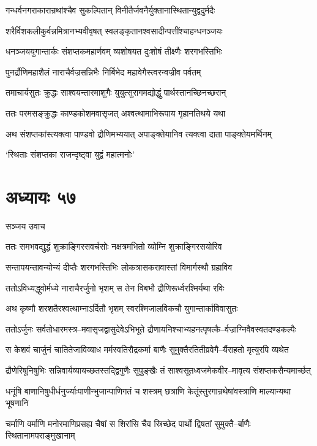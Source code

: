\twolineshloka
{गन्धर्वनगराकारान्रथांश्चैव सुकल्पितान्}
{विनीतैर्जवनैर्युक्तानास्थितान्युद्वदुर्मदैः}


\twolineshloka
{शरैर्विशकलीकुर्वन्नमित्रानभ्यवीवृषत्}
{स्वलङ्कृतानश्वसादीन्पत्तींश्चाहन्धनञ्जयः}


\twolineshloka
{धनञ्जययुगान्तार्कः संशप्तकमहार्णवम्}
{व्यशोषयत दुःशोषं तीक्ष्णैः शरगभस्तिभिः}


\twolineshloka
{पुनर्द्रौणिमहाशैलं नाराचैर्वज्रसन्निभैः}
{निर्बिभेद महावेगैस्त्वरन्वज्रीव पर्वतम्}


\twolineshloka
{तमाचार्यसुतः क्रुद्धः साश्वयन्तारमाशुगैः}
{युयुत्सुरागमद्योद्धुं पार्थस्तानच्छिनच्छरान्}


\twolineshloka
{ततः परमसङ्क्रुद्धः काण्डकोशमवासृजत्}
{अश्वत्थामाभिरूपाय गृहानतिथये यथा}


\twolineshloka
{अथ संशप्तकांस्त्यक्त्वा पाण्डवो द्रौणिमभ्ययात्}
{अपाङ्क्तेयानिव त्यक्त्वा दाता पाङ्क्तेयमर्थिनम्}


`स्थिताः संशप्तका राजन्दृष्ट्वा युद्वं महात्मनोः'
\chapter{अध्यायः ५७}
\twolineshloka
{सञ्जय उवाच}
{}


\twolineshloka
{ततः समभवद्युद्धं शुक्राङ्गिरसवर्चसोः}
{नक्षत्रमभितो व्योम्नि शुक्राङ्गिरसयोरिव}


\twolineshloka
{सन्तापयन्तावन्योन्यं दीप्तैः शरगभस्तिभिः}
{लोकत्रासकरावास्तां विमार्गस्थौ ग्रहाविव}


\twolineshloka
{ततोऽविध्यद्धुवोर्मध्ये नाराचैरर्जुनो भृशम्}
{स तेन विबभौ द्रौणिरूर्ध्वरश्मिर्यथा रविः}


\twolineshloka
{अथ कृष्णौ शरशतैरश्वत्थाम्नाऽर्दितौ भृशम्}
{स्वरश्मिजालविकचौ युगान्तार्काविवासुतः}


\twolineshloka
{ततोऽर्जुनः सर्वतोधारमस्त्र--मवासृजद्वासुदेवेऽभिभूते}
{द्रौणायनिश्चाभ्यहनत्पृषत्कै--र्वज्राग्निवैवस्वतदण्डकल्पैः}


\twolineshloka
{स केशवं चार्जुनं चातितेजाविव्याध मर्मस्वतिरौद्रकर्मा}
{बाणैः सुमुक्तैरतितीव्रवेगै--र्यैराहतो मृत्युरपि व्यथेत}


\twolineshloka
{द्रौणेरिषूनिषुभिः सन्निवार्यव्यायच्छतस्तद्द्विगुणैः सुपुङ्खैः}
{तं साश्वसूतध्वजमेकवीर--मावृत्य संशप्तकसैन्यमार्च्छत्}


\twolineshloka
{धनूंषि बाणानिषुधीर्धनुर्ज्याःपाणीन्भुजान्पाणिगतं च शस्त्रम्}
{छत्राणि केतूंस्तुरगान्रथेषांवस्त्राणि माल्यान्यथा भूषणानि}


\twolineshloka
{चर्माणि वर्माणि मनोरमाणिप्रसह्य चैषां स शिरांसि चैव}
{स्रिच्छेद पार्थो द्विषतां सुमुक्तै--र्बाणैः स्थितानामपराङ्मुखानाम्}


